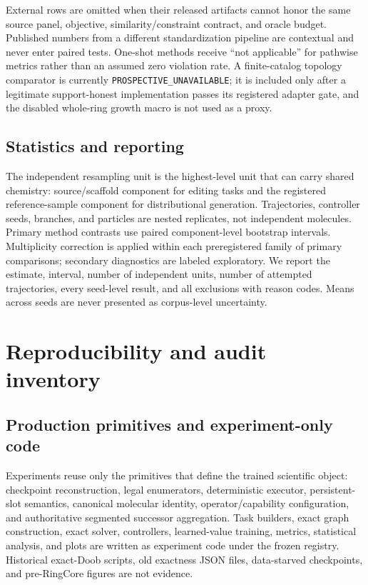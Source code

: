 External rows are omitted when their released artifacts cannot honor the same
source panel, objective, similarity/constraint contract, and oracle budget.
Published numbers from a different standardization pipeline are contextual and
never enter paired tests.  One-shot methods receive ``not applicable'' for
pathwise metrics rather than an assumed zero violation rate.
A finite-catalog topology comparator is currently
\texttt{PROSPECTIVE\_UNAVAILABLE}; it is included only after a legitimate
support-honest implementation passes its registered adapter gate, and the
disabled whole-ring growth macro is not used as a proxy.

\subsection{Statistics and reporting}
\label{app:statistics}

The independent resampling unit is the highest-level unit that can carry
shared chemistry: source/scaffold component for editing tasks and the
registered reference-sample component for distributional generation.
Trajectories, controller seeds, branches, and particles are nested replicates,
not independent molecules.  Primary method contrasts use paired
component-level bootstrap intervals.  Multiplicity correction is applied
within each preregistered family of primary comparisons; secondary diagnostics
are labeled exploratory.  We report the estimate, interval, number of
independent units, number of attempted trajectories, every seed-level result,
and all exclusions with reason codes.  Means across seeds are never presented
as corpus-level uncertainty.

\section{Reproducibility and audit inventory}
\label{app:reproducibility}

\subsection{Production primitives and experiment-only code}

Experiments reuse only the primitives that define the trained scientific
object: checkpoint reconstruction, legal enumerators, deterministic executor,
persistent-slot semantics, canonical molecular identity, operator/capability
configuration, and authoritative segmented successor aggregation.  Task
builders, exact graph construction, exact solver, controllers, learned-value
training, metrics, statistical analysis, and plots are written as experiment
code under the frozen registry.  Historical exact-Doob scripts, old exactness
JSON files, data-starved checkpoints, and pre-RingCore figures are not evidence.

